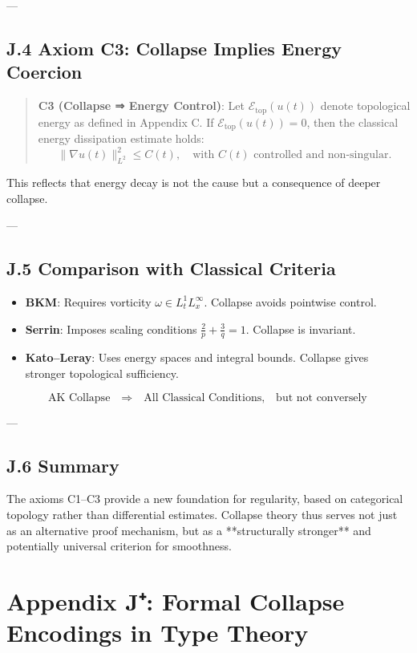 \documentclass[11pt]{article}
\theoremstyle{definition}
\begin{document}
---

\subsection*{J.4 Axiom C3: Collapse Implies Energy Coercion}

\begin{quote}
\textbf{C3 (Collapse ⇒ Energy Control)}:  
Let \( \mathcal{E}_{\text{top}}(u(t)) \) denote topological energy as defined in Appendix C.  
If \( \mathcal{E}_{\text{top}}(u(t)) = 0 \), then the classical energy dissipation estimate holds:
\[
\|\nabla u(t)\|_{L^2}^2 \leq C(t), \quad \text{with } C(t) \text{ controlled and non-singular}.
\]
\end{quote}

This reflects that energy decay is not the cause but a consequence of deeper collapse.

---

\subsection*{J.5 Comparison with Classical Criteria}

\begin{itemize}
  \item \textbf{BKM}: Requires vorticity \( \omega \in L^1_t L^\infty_x \). Collapse avoids pointwise control.
  \item \textbf{Serrin}: Imposes scaling conditions \( \frac{2}{p} + \frac{3}{q} = 1 \). Collapse is invariant.
  \item \textbf{Kato–Leray}: Uses energy spaces and integral bounds. Collapse gives stronger topological sufficiency.
\end{itemize}

\[
\boxed{
\text{AK Collapse} \quad \textbf{⇒} \quad \text{All Classical Conditions},
\quad \text{but not conversely}
}
\]

---

\subsection*{J.6 Summary}

The axioms C1–C3 provide a new foundation for regularity, based on  
categorical topology rather than differential estimates.  
Collapse theory thus serves not just as an alternative proof mechanism,  
but as a **structurally stronger** and potentially universal criterion for smoothness.


\section*{Appendix J⁺: Formal Collapse Encodings in Type Theory}
\end{document}
